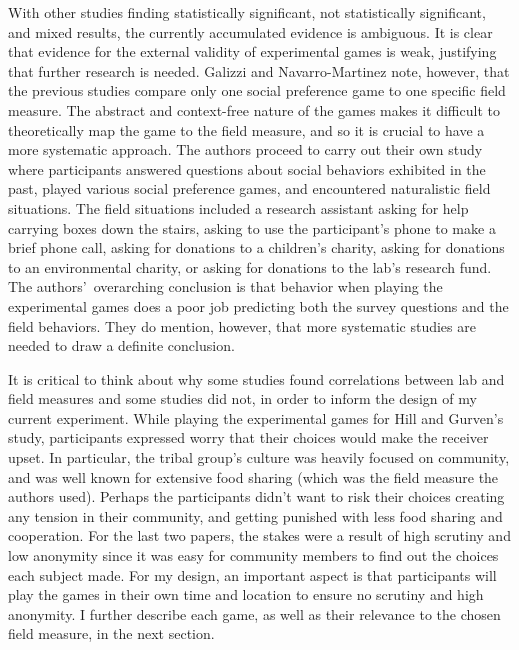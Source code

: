 \documentclass[12pt]{article}
\begin{document}
With other studies finding statistically significant, not statistically significant, and mixed results, the currently accumulated evidence is ambiguous. It is clear that evidence for the external validity of experimental games is weak, justifying that further research is needed. Galizzi and Navarro-Martinez note, however, that the previous studies compare only one social preference game to one specific field measure. The abstract and context-free nature of the games makes it difficult to theoretically map the game to the field measure, and so it is crucial to have a more systematic approach. The authors proceed to carry out their own study where participants answered questions about social behaviors exhibited in the past, played various social preference games, and encountered naturalistic field situations. The field situations included a research assistant asking for help carrying boxes down the stairs, asking to use the participant\rq s phone to make a brief phone call, asking for donations to a children\rq s charity, asking for donations to an environmental charity, or asking for donations to the lab\rq s research fund.  The authors\rq \ overarching conclusion is that behavior when playing the experimental games does a poor job predicting both the survey questions and the field behaviors. They do mention, however, that more systematic studies are needed to draw a definite conclusion.

It is critical to think about why some studies found correlations between lab and field measures and some studies did not, in order to inform the design of my current experiment. {\color{red}While playing the experimental games for Hill and Gurven\rq s study}, participants expressed worry that their choices would make the receiver upset. In particular, the tribal group\rq s culture was heavily focused on community, and was well known for extensive food sharing (which was the field measure the authors used). Perhaps the participants didn\rq t want to risk their choices creating any tension in their community, and getting punished with less food sharing and cooperation. For the last two papers, the stakes were a result of high scrutiny and low anonymity since it was easy for community members to find out the choices each subject made. For my design, an important aspect is that participants will play the games in their own time and location to ensure no scrutiny and high anonymity.  I further describe each game, as well as their relevance to the chosen field measure, in the next section.
\end{document}
